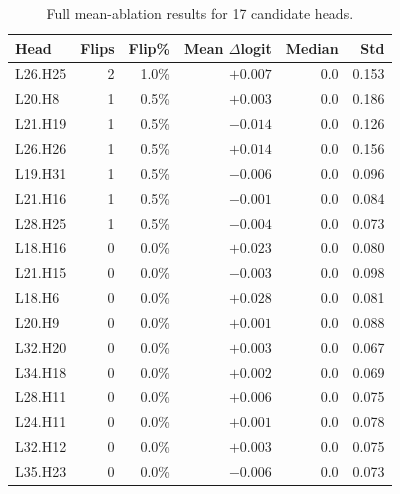 \documentclass{article}
\begin{document}
\begin{table}[h]
\centering
\small
\caption{Full mean-ablation results for 17 candidate heads.}
\label{tab:ablation}
\begin{tabular}{lrrrrr}
\toprule
\textbf{Head} & \textbf{Flips} & \textbf{Flip\%} & \textbf{Mean $\Delta$logit} & \textbf{Median} & \textbf{Std} \\
\midrule
L26.H25 & 2 & 1.0\% & $+0.007$ & 0.0 & 0.153 \\
L20.H8  & 1 & 0.5\% & $+0.003$ & 0.0 & 0.186 \\
L21.H19 & 1 & 0.5\% & $-0.014$ & 0.0 & 0.126 \\
L26.H26 & 1 & 0.5\% & $+0.014$ & 0.0 & 0.156 \\
L19.H31 & 1 & 0.5\% & $-0.006$ & 0.0 & 0.096 \\
L21.H16 & 1 & 0.5\% & $-0.001$ & 0.0 & 0.084 \\
L28.H25 & 1 & 0.5\% & $-0.004$ & 0.0 & 0.073 \\
L18.H16 & 0 & 0.0\% & $+0.023$ & 0.0 & 0.080 \\
L21.H15 & 0 & 0.0\% & $-0.003$ & 0.0 & 0.098 \\
L18.H6  & 0 & 0.0\% & $+0.028$ & 0.0 & 0.081 \\
L20.H9  & 0 & 0.0\% & $+0.001$ & 0.0 & 0.088 \\
L32.H20 & 0 & 0.0\% & $+0.003$ & 0.0 & 0.067 \\
L34.H18 & 0 & 0.0\% & $+0.002$ & 0.0 & 0.069 \\
L28.H11 & 0 & 0.0\% & $+0.006$ & 0.0 & 0.075 \\
L24.H11 & 0 & 0.0\% & $+0.001$ & 0.0 & 0.078 \\
L32.H12 & 0 & 0.0\% & $+0.003$ & 0.0 & 0.075 \\
L35.H23 & 0 & 0.0\% & $-0.006$ & 0.0 & 0.073 \\
\bottomrule
\end{tabular}
\end{table}
\end{document}
